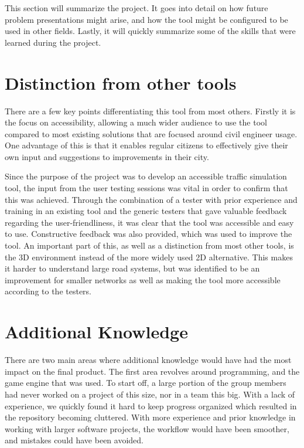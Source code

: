 This section will summarize the project. It goes into detail on how future problem presentations might arise, and how the tool might be configured to be used in other fields. Lastly, it will quickly summarize some of the skills that were learned during the project.

    \section{Distinction from other tools}
        There are a few key points differentiating this tool from most others. Firstly it is the focus on accessibility, allowing a much wider audience to use the tool compared to most existing solutions that are focused around civil engineer usage. One advantage of this is that it enables regular citizens to effectively give their own input and suggestions to improvements in their city.

        Since the purpose of the project was to develop an accessible traffic simulation tool, the input from the user testing sessions was vital in order to confirm that this was achieved. Through the combination of a tester with prior experience and training in an existing tool and the generic testers that gave valuable feedback regarding the user-friendliness, it was clear that the tool was accessible and easy to use. Constructive feedback was also provided, which was used to improve the tool. An important part of this, as well as a distinction from most other tools, is the 3D environment instead of the more widely used 2D alternative. This makes it harder to understand large road systems, but was identified to be an improvement for smaller networks as well as making the tool more accessible according to the testers.

    \section{Additional Knowledge}
        There are two main areas where additional knowledge would have had the most impact on the final product. The first area revolves around programming, and the game engine that was used. To start off, a large portion of the group members had never worked on a project of this size, nor in a team this big. With a lack of experience, we quickly found it hard to keep progress organized which resulted in the repository becoming cluttered. With more experience and prior knowledge in working with larger software projects, the workflow would have been smoother, and mistakes could have been avoided.

